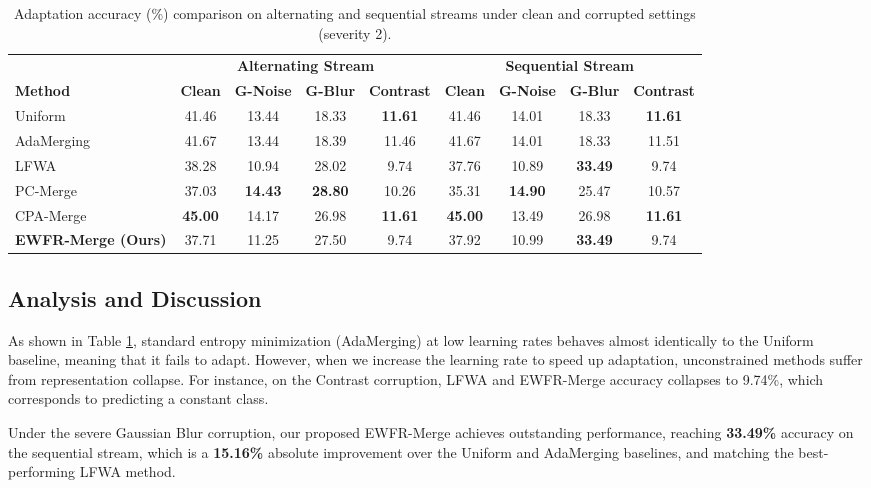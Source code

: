 \documentclass{article}
\theoremstyle{plain}
\theoremstyle{definition}
\theoremstyle{remark}
\begin{document}
\begin{table}[t]
\centering
\caption{Adaptation accuracy (\%) comparison on alternating and sequential streams under clean and corrupted settings (severity 2).}
\label{tab:results}
\begin{tabular}{lcccccccc}
\toprule
& \multicolumn{4}{c}{\textbf{Alternating Stream}} & \multicolumn{4}{c}{\textbf{Sequential Stream}} \\
\cmidrule(lr){2-5} \cmidrule(lr){6-9}
\textbf{Method} & \textbf{Clean} & \textbf{G-Noise} & \textbf{G-Blur} & \textbf{Contrast} & \textbf{Clean} & \textbf{G-Noise} & \textbf{G-Blur} & \textbf{Contrast} \\
\midrule
Uniform & 41.46 & 13.44 & 18.33 & \textbf{11.61} & 41.46 & 14.01 & 18.33 & \textbf{11.61} \\
AdaMerging & 41.67 & 13.44 & 18.39 & 11.46 & 41.67 & 14.01 & 18.33 & 11.51 \\
LFWA & 38.28 & 10.94 & 28.02 & 9.74 & 37.76 & 10.89 & \textbf{33.49} & 9.74 \\
PC-Merge & 37.03 & \textbf{14.43} & \textbf{28.80} & 10.26 & 35.31 & \textbf{14.90} & 25.47 & 10.57 \\
CPA-Merge & \textbf{45.00} & 14.17 & 26.98 & \textbf{11.61} & \textbf{45.00} & 13.49 & 26.98 & \textbf{11.61} \\
\midrule
\textbf{EWFR-Merge (Ours)} & 37.71 & 11.25 & 27.50 & 9.74 & 37.92 & 10.99 & \textbf{33.49} & 9.74 \\
\bottomrule
\end{tabular}
\end{table}

\subsection{Analysis and Discussion}
As shown in Table \ref{tab:results}, standard entropy minimization (AdaMerging) at low learning rates behaves almost identically to the Uniform baseline, meaning that it fails to adapt. However, when we increase the learning rate to speed up adaptation, unconstrained methods suffer from representation collapse. For instance, on the Contrast corruption, LFWA and EWFR-Merge accuracy collapses to 9.74\%, which corresponds to predicting a constant class. 

Under the severe Gaussian Blur corruption, our proposed EWFR-Merge achieves outstanding performance, reaching \textbf{33.49\%} accuracy on the sequential stream, which is a \textbf{15.16\%} absolute improvement over the Uniform and AdaMerging baselines, and matching the best-performing LFWA method. 
\end{document}
